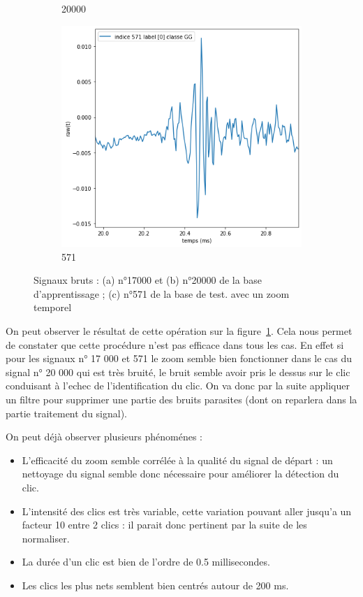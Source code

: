 \begin{figure}[!h]
\begin{subfigure}[b]{0.3\textwidth}
  \caption{20000}
  \end{subfigure}
  \begin{subfigure}[b]{0.3\textwidth}
    \includegraphics[width=\textwidth]{./images/indice571Spectro1Dlabel9classeZCsansprocessingaveczoom.png}
  \caption{571}
  \end{subfigure}
  \caption{Signaux bruts : (a) n°17000 et (b) n°20000 de la base d'apprentissage ; (c) n°571 de la base de test. avec un zoom temporel%
  \label{fig:signauxbrutszoom}}
\end{figure}

On peut observer le résultat de cette opération sur la figure~\ref{fig:signauxbrutszoom}.
Cela nous permet de constater que cette procédure n'est pas efficace dans tous les cas. En effet si pour les signaux n° 17 000 et 571 le zoom semble bien fonctionner dans le cas du signal n° 20 000 qui est très bruité, le bruit semble avoir pris le dessus sur le clic conduisant à l'echec de l'identification du clic.
On va donc par la suite appliquer un filtre pour supprimer une partie des bruits parasites (dont on reparlera dans la partie traitement du signal).

On peut déjà observer plusieurs phénoménes :
\begin{itemize}
\item L'efficacité du zoom semble corrélée à la qualité du signal de départ : un nettoyage du signal semble donc nécessaire pour améliorer la détection du clic.
\item L'intensité des clics est très  variable, cette variation pouvant aller jusqu'a un facteur 10 entre 2 clics : il parait donc pertinent par la suite de les normaliser.
\item La durée d'un clic est bien de l'ordre de 0.5 millisecondes.
\item Les clics les plus nets semblent bien centrés autour de 200 ms.
\end{itemize}

